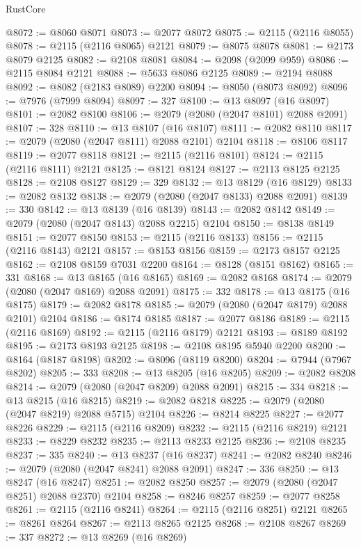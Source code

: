 \begin{lexlean}{RustCore}
\begin{coremodule}
@8072 := @8060 @8071
@8073 := @2077 @8072
@8075 := @2115 (@2116 @8055)
@8078 := @2115 (@2116 @8065) @2121
@8079 := @8075 @8078
@8081 := @2173 @8079 @2125
@8082 := @2108 @8081
@8084 := @2098 (@2099 @959)
@8086 := @2115 @8084 @2121
@8088 := @5633 @8086 @2125
@8089 := @2194 @8088
@8092 := @8082 (@2183 @8089) @2200
@8094 := @8050 (@8073 @8092)
@8096 := @7976 (@7999 @8094)
@8097 := 327
@8100 := @13 @8097 (@16 @8097)
@8101 := @2082 @8100
@8106 := @2079 (@2080 (@2047 @8101) @2088 @2091)
@8107 := 328
@8110 := @13 @8107 (@16 @8107)
@8111 := @2082 @8110
@8117 := @2079 (@2080 (@2047 @8111) @2088 @2101) @2104
@8118 := @8106 @8117
@8119 := @2077 @8118
@8121 := @2115 (@2116 @8101)
@8124 := @2115 (@2116 @8111) @2121
@8125 := @8121 @8124
@8127 := @2113 @8125 @2125
@8128 := @2108 @8127
@8129 := 329
@8132 := @13 @8129 (@16 @8129)
@8133 := @2082 @8132
@8138 := @2079 (@2080 (@2047 @8133) @2088 @2091)
@8139 := 330
@8142 := @13 @8139 (@16 @8139)
@8143 := @2082 @8142
@8149 := @2079 (@2080 (@2047 @8143) @2088 @2215) @2104
@8150 := @8138 @8149
@8151 := @2077 @8150
@8153 := @2115 (@2116 @8133)
@8156 := @2115 (@2116 @8143) @2121
@8157 := @8153 @8156
@8159 := @2173 @8157 @2125
@8162 := @2108 @8159 @7031 @2200
@8164 := @8128 (@8151 @8162)
@8165 := 331
@8168 := @13 @8165 (@16 @8165)
@8169 := @2082 @8168
@8174 := @2079 (@2080 (@2047 @8169) @2088 @2091)
@8175 := 332
@8178 := @13 @8175 (@16 @8175)
@8179 := @2082 @8178
@8185 := @2079 (@2080 (@2047 @8179) @2088 @2101) @2104
@8186 := @8174 @8185
@8187 := @2077 @8186
@8189 := @2115 (@2116 @8169)
@8192 := @2115 (@2116 @8179) @2121
@8193 := @8189 @8192
@8195 := @2173 @8193 @2125
@8198 := @2108 @8195 @5940 @2200
@8200 := @8164 (@8187 @8198)
@8202 := @8096 (@8119 @8200)
@8204 := @7944 (@7967 @8202)
@8205 := 333
@8208 := @13 @8205 (@16 @8205)
@8209 := @2082 @8208
@8214 := @2079 (@2080 (@2047 @8209) @2088 @2091)
@8215 := 334
@8218 := @13 @8215 (@16 @8215)
@8219 := @2082 @8218
@8225 := @2079 (@2080 (@2047 @8219) @2088 @5715) @2104
@8226 := @8214 @8225
@8227 := @2077 @8226
@8229 := @2115 (@2116 @8209)
@8232 := @2115 (@2116 @8219) @2121
@8233 := @8229 @8232
@8235 := @2113 @8233 @2125
@8236 := @2108 @8235
@8237 := 335
@8240 := @13 @8237 (@16 @8237)
@8241 := @2082 @8240
@8246 := @2079 (@2080 (@2047 @8241) @2088 @2091)
@8247 := 336
@8250 := @13 @8247 (@16 @8247)
@8251 := @2082 @8250
@8257 := @2079 (@2080 (@2047 @8251) @2088 @2370) @2104
@8258 := @8246 @8257
@8259 := @2077 @8258
@8261 := @2115 (@2116 @8241)
@8264 := @2115 (@2116 @8251) @2121
@8265 := @8261 @8264
@8267 := @2113 @8265 @2125
@8268 := @2108 @8267
@8269 := 337
@8272 := @13 @8269 (@16 @8269)

\end{coremodule}
\end{lexlean}
